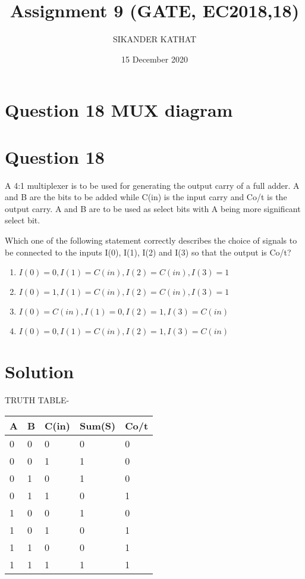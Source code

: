 \documentclass{article}
\title{Assignment 9 (GATE, EC2018,18)}
\author{SIKANDER KATHAT }
\date{15 December 2020}
\begin{document}
\maketitle

\section{ Question  18 MUX diagram }

\section{Question 18}
A 4:1 multiplexer is to be used for generating the output carry of a full adder. A and B are the bits to be added while C(in) is the input carry and Co/t is the output carry. A and B are to be used as select bits with A being more significant select bit.

Which one of the following statement correctly describes the choice of signals to be connected to the inputs I(0), I(1), I(2) and I(3) so that the output is Co/t?

\begin{enumerate}
    \item$I(0)=0,I(1)=C(in),I(2)=C(in),I(3)=1$
    \item$I(0)=1,I(1)=C(in),I(2)=C(in),I(3)=1$
    \item$I(0)=C(in),I(1)=0,I(2)=1,I(3)=C(in)$
    \item$I(0)=0,I(1)=C(in),I(2)=1,I(3)=C(in)$
\end{enumerate}


\section{Solution}

TRUTH TABLE-
\begin{table}[truth table]
\begin{tabular}{|l|l|l|l|l|}
\hline
A & B & C(in) & Sum(S) & Co/t \\ \hline
0 & 0 & 0     & 0      & 0    \\
0 & 0 & 1     & 1      & 0    \\
0 & 1 & 0     & 1      & 0    \\ 
0 & 1 & 1     & 0      & 1    \\
1 & 0 & 0     & 1      & 0    \\
1 & 0 & 1     & 0      & 1    \\
1 & 1 & 0     & 0      & 1    \\
1 & 1 & 1     & 1      & 1    \\ \hline
\end{tabular}
\end{table}
\end{document}
